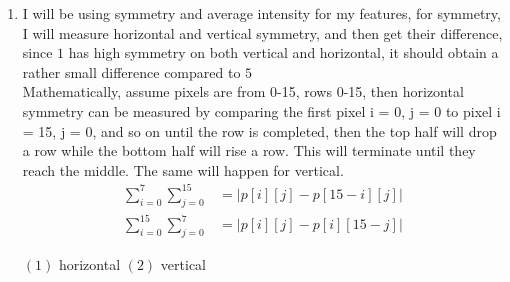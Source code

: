 \documentclass{article}
\begin{document}
\begin{enumerate}
\begin{enumerate}[label=(\alph*)]
            \item I will be using symmetry and average intensity for my features, for symmetry, I will measure horizontal and vertical symmetry, and then get their difference, since $1$ has high symmetry on both vertical and horizontal, it should obtain a rather small difference compared to $5$\\[0.25in]
            Mathematically, assume pixels are from 0-15, rows 0-15, then horizontal symmetry can be measured by comparing the first pixel i = 0, j = 0 to pixel i = 15, j = 0, and so on until the row is completed, then the top half will drop a row while the bottom half will rise a row. This will terminate until they reach the middle. The same will happen for vertical.
            \begin{align}
                \sum_{i = 0}^{7} \sum_{j = 0}^{15} &= | p[i][j] - p[15 - i][j] |\\
                \sum_{i = 0}^{15} \sum_{j = 0}^{7} &= | p[i][j] - p[i][15 - j] |
            \end{align}

            $(1)$ horizontal
            $(2)$ vertical


\end{enumerate}
\end{enumerate}
\end{document}
